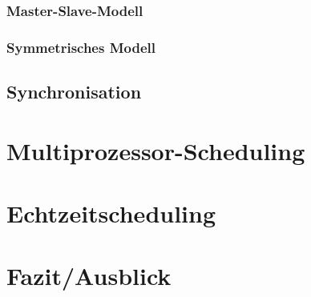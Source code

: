 \subsubsection{Master-Slave-Modell}
\subsubsection{Symmetrisches Modell}
\subsection{Synchronisation}
\section{Multiprozessor-Scheduling}
\section{Echtzeitscheduling}
\section{Fazit/Ausblick}

\pagebreak
\nocite{*}
